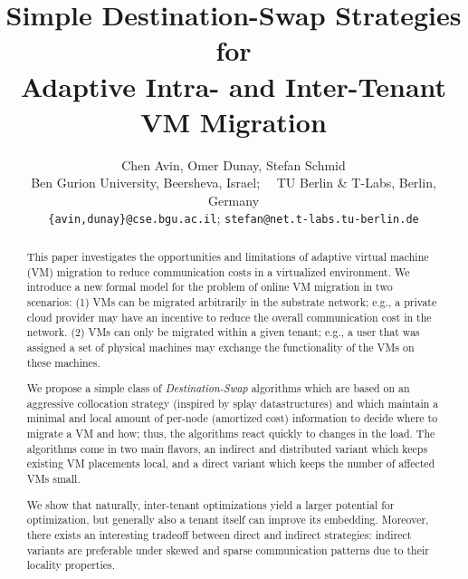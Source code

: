 \documentclass[conference]{IEEEtran}
\begin{document}
\title{Simple Destination-Swap Strategies for\\Adaptive Intra- and Inter-Tenant VM Migration}



\author {Chen Avin, Omer Dunay, Stefan Schmid\\
{\small  Ben Gurion University, Beersheva, Israel;~~  TU Berlin \& T-Labs, Berlin, Germany}\\
{\small \texttt{\{avin,dunay\}@cse.bgu.ac.il}; \texttt{stefan@net.t-labs.tu-berlin.de}}\\}

\date{}


\maketitle \thispagestyle{empty}
\sloppy

\begin{abstract}
This paper investigates the opportunities and limitations of
adaptive virtual machine (VM) migration to reduce communication costs in a virtualized
environment. We introduce a new formal model for the problem of online VM migration in two scenarios: (1) VMs can be migrated arbitrarily in the substrate network;
e.g., a private cloud provider may have an incentive to reduce the overall communication cost in the network.
(2) VMs can only be migrated within a given tenant; e.g., a user that was assigned a set of physical machines
may exchange the functionality of the VMs on these machines.

We propose a simple class of \emph{Destination-Swap} algorithms which are based on an aggressive collocation strategy
(inspired by splay datastructures) and which maintain a minimal and local amount of per-node (amortized cost) information
to decide where to migrate a VM and how; thus, the algorithms react quickly to changes in the load.
The algorithms
come in two main flavors, an indirect and distributed variant which keeps existing VM placements local, and a direct variant
 which keeps the number of affected VMs small.

We show that naturally, inter-tenant optimizations yield a larger
potential for optimization, but generally also a tenant itself can improve its embedding. Moreover, there exists an interesting
tradeoff between direct and indirect strategies: indirect variants are preferable under skewed and sparse communication patterns
due to their locality properties.
\end{abstract}
\end{document}
